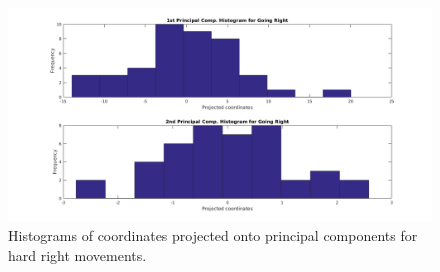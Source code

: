 \documentclass[paper=a4, fontsize=11pt]{scrartcl} %
\begin{document}
    \begin{figure}[h!]
        \begin{center}
            \setlength{\fboxsep}{0.5pt} %
            \setlength{\fboxrule}{0.5pt}
            \includegraphics[width=\linewidth,fbox]{images/pca_histogram_Right.png}
            \caption{Histograms of coordinates projected onto principal components for hard right movements.}
        \end{center}
    \end{figure}
\end{document}
